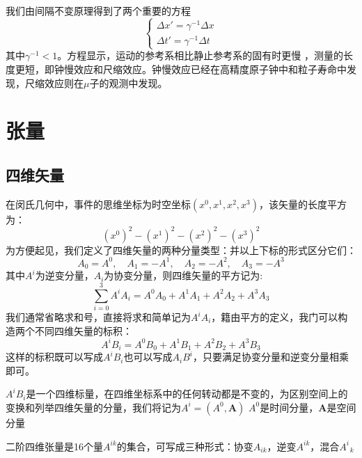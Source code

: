 \documentclass[12pt]{report}
\newcommand{\vecb}[1]{\boldsymbol{#1}}
\begin{document}
我们由间隔不变原理得到了两个重要的方程
\begin{equation*}
    \left\{
        \begin{array}{ll}
            \Delta {x'}=\gamma ^{-1} \Delta x\\
            \Delta {t'}=\gamma ^{-1} \Delta t
        \end{array}
    \right.
\end{equation*}
其中$\gamma ^{-1}<1$。方程显示，运动的参考系相比静止参考系的固有时更慢
，测量的长度更短，即钟慢效应和尺缩效应。钟慢效应已经在高精度原子钟中和粒子寿命中发现，尺缩效应则在$\mu$子的观测中发现。                                                                                  


\section{张量}
\subsection{四维矢量}
在闵氏几何中，事件的思维坐标为时空坐标$(x^0,x^1,x^2,x^3)$，该矢量的长度平方为：
$$(x^0)^2-(x^1)^2-(x^2)^2-(x^3)^2$$
为方便起见，我们定义了四维矢量的两种分量类型：并以上下标的形式区分它们：
$$A_0=A^0,\quad A_1=-A^1,\quad A_2=-A^2,\quad A_3=-A^3$$
其中$A^i$为逆变分量，$A_i$为协变分量，则四维矢量的平方记为:
$$ \sum_{i=0}^{3} A^iA_i=A^0A_0+A^1A_1+A^2A_2+A^3A_3$$
我们通常省略求和号，直接将求和简单记为$A^iA_i$，籍由平方的定义，我门可以构造两个不同四维矢量的标积：
$$ A^iB_i=A^0B_0+A^1B_1+A^2B_2+A^3B_3$$
这样的标积既可以写成$A^iB_i$也可以写成$A_iB^i$，只要满足协变分量和逆变分量相乘即可。\par
$A^iB_i$是一个四维标量，在四维坐标系中的任何转动都是不变的，为区别空间上的变换和列举四维矢量的分量，我们将记为$A^i=(A^0,\vecb{A})$
$A^0$是时间分量，$\vecb{A}$是空间分量\par
二阶四维张量是16个量$A^{ik}$的集合，可写成三种形式：协变$A_{ik}$，逆变$A^{ik}$，混合$A^i_{\,\,\,k}$
\end{document}
